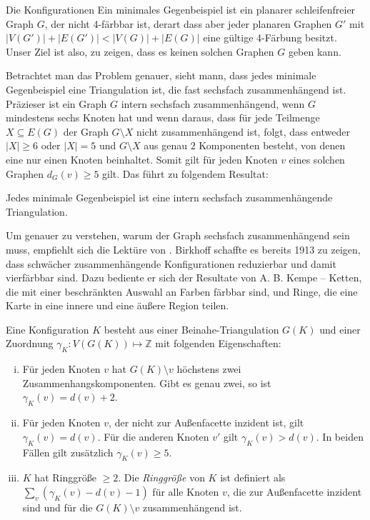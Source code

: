   \begin{section}{Die Konfigurationen}
   Ein minimales Gegenbeispiel ist ein planarer schleifenfreier Graph $G$, der nicht 4-färbbar ist, derart dass aber jeder planaren Graphen $G'$ mit $|V(G')| + |E(G')| < |V(G)| + |E(G)|$ eine gültige 4-Färbung besitzt. Unser Ziel ist also, zu zeigen, dass es keinen solchen Graphen $G$ geben kann. 
   
   Betrachtet man das Problem genauer, sieht mann, dass jedes minimale Gegenbeispiel eine Triangulation ist, die fast sechsfach zusammenhängend ist. Präzieser ist ein Graph $G$ intern sechsfach zusammenhängend, wenn $G$ mindestens sechs Knoten hat und wenn daraus, dass für jede Teilmenge $X \subseteq E(G)$ der Graph $G\setminus X$ nicht zusammenhängend ist, folgt, dass entweder $|X| \geq 6$ oder $|X| = 5$ und $G\setminus X$ aus genau $2$ Komponenten besteht, von denen eine nur einen Knoten beinhaltet. Somit gilt für jeden Knoten $v$ eines solchen Graphen $d_G(v) \geq 5$ gilt. Das führt zu folgendem Resultat:
  
  \begin{satz}[]
   Jedes minimale Gegenbeispiel ist eine intern sechsfach zusammenhängende Triangulation. 
  \end{satz}

  Um genauer zu verstehen, warum der Graph sechsfach zusammenhängend sein muss, empfiehlt sich die Lektüre von \cite{AmJMath35}. Birkhoff schaffte es bereits 1913 zu zeigen, dass schwächer zusammenhängende Konfigurationen reduzierbar und damit vierfärbbar sind. Dazu bediente er sich der Resultate von A. B. Kempe -- Ketten, die mit einer beschränkten Auswahl an Farben färbbar sind, und Ringe, die eine Karte in eine innere und eine äußere Region teilen. 
  
  \begin{definition}[Konfiguration]
   Eine Konfiguration $K$ besteht aus einer Beinahe-Triangulation $G(K)$ und einer Zuordnung $\gamma_K : V(G(K)) \mapsto \mathbb{Z}$ mit folgenden Eigenschaften:
   \begin{enumerate}[i)]
    \item Für jeden Knoten $v$ hat $G(K) \setminus v$ höchstens zwei Zusammenhangskomponenten. Gibt es genau zwei, so ist $\gamma_K(v) = d(v) + 2$.
    \item Für jeden Knoten $v$, der nicht zur Außenfacette inzident ist, gilt $\gamma_K(v) = d(v)$. Für die anderen Knoten $v'$ gilt $\gamma_K(v) > d(v)$. In beiden Fällen gilt zusätzlich $\gamma_K(v) \geq 5$.
    \item $K$ hat Ringgröße $\geq 2$. Die \textit{Ringgröße} von $K$ ist definiert als $\sum_v (\gamma_K(v) - d(v) - 1)$ für alle Knoten $v$, die zur Außenfacette inzident sind und für die $G(K) \setminus v$ zusammenhängend ist.
   \end{enumerate}
  \end{definition}
   

\end{section}
